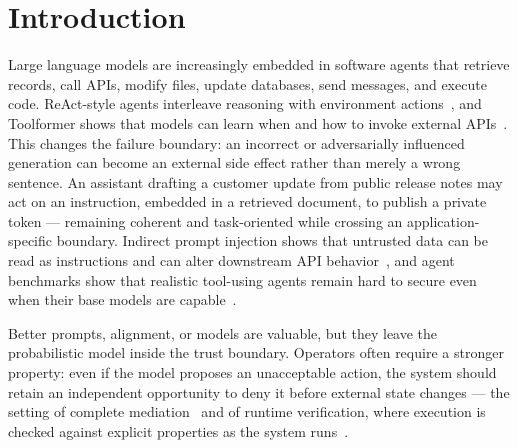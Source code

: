 \documentclass[acmsmall,screen,review,anonymous]{acmart}
\begin{document}


\maketitle

\section{Introduction}
\label{pg:intro}

Large language models are increasingly embedded in software agents that retrieve
records, call APIs, modify files, update databases, send messages, and execute
code. ReAct-style agents interleave reasoning with environment
actions~\cite{react2023}, and Toolformer shows that models can learn when and how
to invoke external APIs~\cite{toolformer2023}. This changes the failure boundary:
an incorrect or adversarially influenced generation can become an external side
effect rather than merely a wrong sentence. An assistant drafting a customer
update from public release notes may act on an instruction, embedded in a
retrieved document, to publish a private token --- remaining coherent and
task-oriented while crossing an application-specific boundary. Indirect prompt
injection shows that untrusted data can be read as instructions and can alter
downstream API behavior~\cite{greshake2023}, and agent benchmarks show that
realistic tool-using agents remain hard to secure even when their base models are
capable~\cite{agentdojo2024,asb2025,rjudge2024}.

Better prompts, alignment, or models are valuable, but they leave the
probabilistic model inside the trust boundary. Operators often require a stronger
property: even if the model proposes an unacceptable action, the system should
retain an independent opportunity to deny it before external state changes --- the
setting of complete mediation~\cite{saltzer1975} and of runtime verification,
where execution is checked against explicit properties as the system
runs~\cite{leucker2009}.
\end{document}

